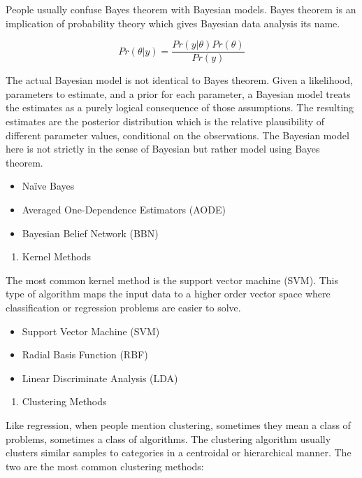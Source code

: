 \documentclass[12pt,]{krantz}
\providecommand{\tightlist}{%
  \setlength{\itemsep}{0pt}\setlength{\parskip}{0pt}}
\theoremstyle{definition}
\theoremstyle{definition}
\theoremstyle{definition}
\theoremstyle{remark}
\begin{document}
People usually confuse Bayes theorem with Bayesian models. Bayes theorem
is an implication of probability theory which gives Bayesian data
analysis its name.

\[Pr(\theta|y)=\frac{Pr(y|\theta)Pr(\theta)}{Pr(y)}\]

The actual Bayesian model is not identical to Bayes theorem. Given a
likelihood, parameters to estimate, and a prior for each parameter, a
Bayesian model treats the estimates as a purely logical consequence of
those assumptions. The resulting estimates are the posterior
distribution which is the relative plausibility of different parameter
values, conditional on the observations. The Bayesian model here is not
strictly in the sense of Bayesian but rather model using Bayes theorem.

\begin{itemize}
\tightlist
\item
  Naïve Bayes
\item
  Averaged One-Dependence Estimators (AODE)
\item
  Bayesian Belief Network (BBN)
\end{itemize}

\begin{enumerate}
\def\labelenumi{\arabic{enumi}.}
\setcounter{enumi}{6}
\tightlist
\item
  Kernel Methods
\end{enumerate}

The most common kernel method is the support vector machine (SVM). This
type of algorithm maps the input data to a higher order vector space
where classification or regression problems are easier to solve.

\begin{itemize}
\tightlist
\item
  Support Vector Machine (SVM)
\item
  Radial Basis Function (RBF)
\item
  Linear Discriminate Analysis (LDA)
\end{itemize}

\begin{enumerate}
\def\labelenumi{\arabic{enumi}.}
\setcounter{enumi}{7}
\tightlist
\item
  Clustering Methods
\end{enumerate}

Like regression, when people mention clustering, sometimes they mean a
class of problems, sometimes a class of algorithms. The clustering
algorithm usually clusters similar samples to categories in a centroidal
or hierarchical manner. The two are the most common clustering methods:
\end{document}
